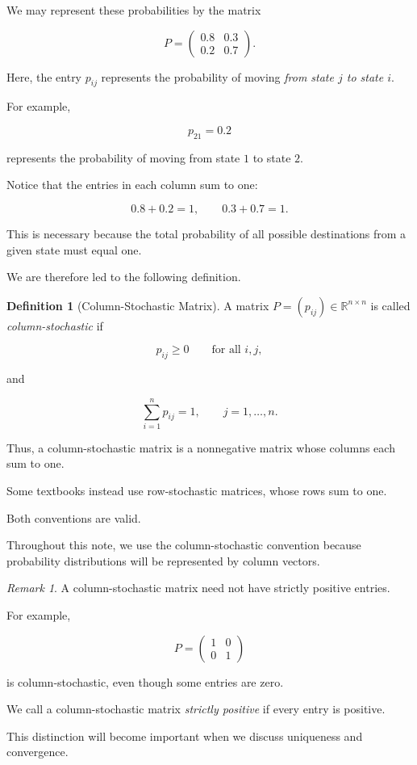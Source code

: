 \documentclass[11pt,a4paper]{article}
\theoremstyle{definition}
\newtheorem{definition}[theorem]{Definition}
\theoremstyle{remark}
\newtheorem{remark}[theorem]{Remark}
\begin{document}
We may represent these
probabilities by the matrix

\begin{equation}
P=
\begin{pmatrix}
0.8 & 0.3\\
0.2 & 0.7
\end{pmatrix}.
\label{eq:stochastic_example}
\end{equation}

Here, the entry $p_{ij}$
represents the probability
of moving \emph{from state $j$
to state $i$}.

For example,

\[
p_{21}=0.2
\]

represents the probability
of moving from state $1$
to state $2$.

Notice that the entries
in each column sum to one:

\[
0.8+0.2=1,
\qquad
0.3+0.7=1.
\]

This is necessary because
the total probability of all
possible destinations from
a given state must equal one.

We are therefore led to
the following definition.

\begin{definition}[Column-Stochastic Matrix]

A matrix
$P=(p_{ij})\in\mathbb{R}^{n\times n}$
is called \emph{column-stochastic} if

\[
p_{ij}\geq0
\qquad
\text{for all }i,j,
\]

and

\begin{equation}
\sum_{i=1}^{n}p_{ij}=1,
\qquad j=1,\ldots,n.
\label{eq:column_stochastic}
\end{equation}

\end{definition}

Thus, a column-stochastic
matrix is a nonnegative matrix
whose columns each sum to one.

Some textbooks instead use
row-stochastic matrices,
whose rows sum to one.

Both conventions are valid.

Throughout this note,
we use the column-stochastic
convention because probability
distributions will be represented
by column vectors.

\begin{remark}
A column-stochastic matrix
need not have strictly positive
entries.

For example,

\[
P=
\begin{pmatrix}
1&0\\
0&1
\end{pmatrix}
\]

is column-stochastic, even
though some entries are zero.

We call a column-stochastic
matrix \emph{strictly positive}
if every entry is positive.

This distinction will become
important when we discuss
uniqueness and convergence.
\end{remark}
\end{document}

